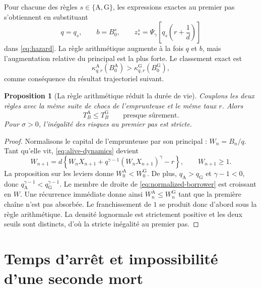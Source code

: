 \documentclass[11pt,a4paper]{article}
\newcommand{\1}{\mathbf 1}
\newtheorem{proposition}[theorem]{Proposition}
\theoremstyle{definition}
\theoremstyle{remark}
\begin{document}
Pour chacune des règles $s\in\{\mathrm A,\mathrm G\}$, les expressions
exactes au premier pas s'obtiennent en substituant
\begin{equation}
q=q_s,\qquad b=B_0^s,\qquad
z_*^s=\Psi_\gamma\!\left[q_s\left(r+\frac1d\right)\right]
\label{eq:schemes-substitution}
\end{equation}
dans \eqref{eq:hazard}. La règle arithmétique augmente à la fois $q$ et
$b$, mais l'augmentation relative du principal est la plus forte. Le
classement exact est
\begin{equation}
\kappa^{\mathrm A}_{q,r}(B_0^{\mathrm A})
>\kappa^{\mathrm G}_{q,r}(B_0^{\mathrm G}),
\label{eq:hazard-scheme-order}
\end{equation}
comme conséquence du résultat trajectoriel suivant.

\begin{proposition}[La règle arithmétique réduit la durée de vie]
\label{prop:A-before-G}
Couplons les deux règles avec la même suite de chocs de l'emprunteuse et
le même taux $r$. Alors
\begin{equation}
T_B^{\mathrm A}\leq T_B^{\mathrm G}
\qquad\text{presque sûrement}.
\label{eq:TA-TG}
\end{equation}
Pour $\sigma>0$, l'inégalité des risques au premier pas est stricte.
\end{proposition}
\begin{proof}
Normalisons le capital de l'emprunteuse par son principal : $W_n=B_n/q$.
Tant qu'elle vit, \eqref{eq:alive-dynamics} devient
\begin{equation}
W_{n+1}=d\left\{W_nX_{n+1}
+q^{\gamma-1}(W_nX_{n+1})^\gamma-r\right\},
\qquad W_{n+1}\geq1.
\label{eq:normalized-borrower}
\end{equation}
La proposition sur les leviers donne
$W_0^{\mathrm A}<W_0^{\mathrm G}$. De plus,
$q_{\mathrm A}>q_{\mathrm G}$ et $\gamma-1<0$, donc
$q_{\mathrm A}^{\gamma-1}<q_{\mathrm G}^{\gamma-1}$. Le membre de droite
de \eqref{eq:normalized-borrower} est croissant en $W$. Une récurrence
immédiate donne ainsi $W_n^{\mathrm A}\leq W_n^{\mathrm G}$ tant que la
première chaîne n'est pas absorbée. Le franchissement de $1$ se produit
donc d'abord sous la règle arithmétique. La densité lognormale est
strictement positive et les deux seuils sont distincts, d'où la stricte
inégalité au premier pas.
\end{proof}

\section{Temps d'arrêt et impossibilité d'une seconde mort}
\end{document}

